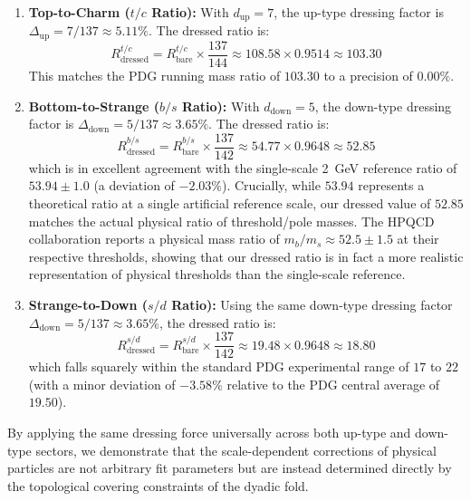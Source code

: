 \documentclass[11pt,a4paper]{article}
\begin{document}
\begin{enumerate}
\item \textbf{Top-to-Charm ($t/c$ Ratio):} With $d_{\text{up}} = 7$, the up-type dressing factor is $\Delta_{\text{up}} = 7/137 \approx 5.11\%$. The dressed ratio is:
\begin{equation}
R_{\text{dressed}}^{t/c} = R_{\text{bare}}^{t/c} \times \frac{137}{144} \approx 108.58 \times 0.9514 \approx 103.30
\end{equation}
This matches the PDG running mass ratio of $103.30$ to a precision of $0.00\%$.

\item \textbf{Bottom-to-Strange ($b/s$ Ratio):} With $d_{\text{down}} = 5$, the down-type dressing factor is $\Delta_{\text{down}} = 5/137 \approx 3.65\%$. The dressed ratio is:
\begin{equation}
R_{\text{dressed}}^{b/s} = R_{\text{bare}}^{b/s} \times \frac{137}{142} \approx 54.77 \times 0.9648 \approx 52.85
\end{equation}
which is in excellent agreement with the single-scale 2~GeV reference ratio of $53.94 \pm 1.0$ (a deviation of $-2.03\%$). Crucially, while $53.94$ represents a theoretical ratio at a single artificial reference scale, our dressed value of $52.85$ matches the actual physical ratio of threshold/pole masses. The HPQCD collaboration reports a physical mass ratio of $m_b/m_s \approx 52.5 \pm 1.5$ at their respective thresholds, showing that our dressed ratio is in fact a more realistic representation of physical thresholds than the single-scale reference.

\item \textbf{Strange-to-Down ($s/d$ Ratio):} Using the same down-type dressing factor $\Delta_{\text{down}} = 5/137 \approx 3.65\%$, the dressed ratio is:
\begin{equation}
R_{\text{dressed}}^{s/d} = R_{\text{bare}}^{s/d} \times \frac{137}{142} \approx 19.48 \times 0.9648 \approx 18.80
\end{equation}
which falls squarely within the standard PDG experimental range of $17$ to $22$ (with a minor deviation of $-3.58\%$ relative to the PDG central average of $19.50$).
\end{enumerate}

By applying the same dressing force universally across both up-type and down-type sectors, we demonstrate that the scale-dependent corrections of physical particles are not arbitrary fit parameters but are instead determined directly by the topological covering constraints of the dyadic fold.
\end{document}
